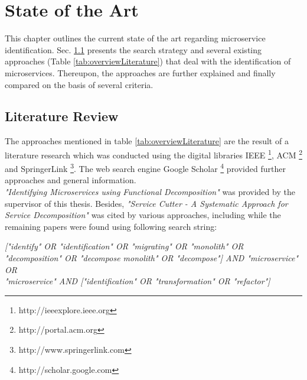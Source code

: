 

\chapter{State of the Art}
\label{ch:StateOfTheArt}
This chapter outlines the current state of the art regarding microservice identification.  Sec. \ref{sec:StateOfTheArt:LiteratureReview} presents the search strategy and several existing approaches (Table \ref{tab:overviewLiterature}) that deal with the identification of microservices. Thereupon, the approaches are further explained and finally compared on the basis of several criteria.

\section{Literature Review}
\label{sec:StateOfTheArt:LiteratureReview}
The approaches mentioned in table \ref{tab:overviewLiterature} are the result of a literature research which was conducted using the digital libraries IEEE \footnote{http://ieeexplore.ieee.org }, ACM \footnote{http://portal.acm.org} and SpringerLink \footnote{http://www.springerlink.com }. The web search engine Google Scholar \footnote{http://scholar.google.com} provided further approaches and general information. \\ 
\textit{"Identifying Microservices using Functional Decomposition"} \cite{FunctionalDecompositionHeinrich} was provided by the supervisor of this thesis. Besides, \textit{"Service Cutter - A Systematic Approach for Service Decomposition"} \cite{ServiceCutter} was cited by various approaches, including \cite{interfaceAnalysisBaresi} while the remaining papers were found using following search string: 

\vspace{1cm}
\begin{centering}
{\itshape
   ["identify" OR "identification" OR "migrating" OR "monolith" OR "decomposition" OR "decompose monolith"
  	OR "decompose"] AND  "microservice"  \\
  	   OR \\  "microservice"  AND ["identification" OR "transformation" OR "refactor"]
} \\

 
   
\end{centering}
\vspace{1cm}

